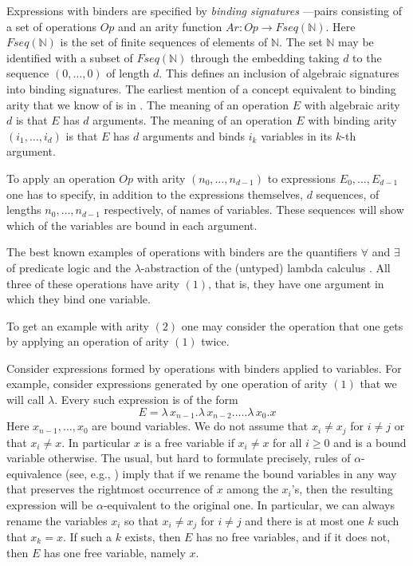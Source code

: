 \documentclass[onecolumn,12pt]{amsart}
\numberwithin{proposition}{subsection}
\newcommand{\sr}{\rightarrow}
\newcommand{\nn}{{\mathbb N}}
\newcommand{\nat}{\nn}
\begin{document}
Expressions with binders are specified by {\em binding signatures}%
---pairs consisting of a set of operations $Op$ and an arity function $Ar:Op\sr Fseq(\nat)$.
Here $Fseq(\nat)$ is the set of finite sequences of elements of
$\nat$. The set $\nat$ may be identified with a subset of $Fseq(\nat)$ through the
embedding taking $d$ to the sequence $(0,\dots,0)$ of length $d$. This defines
an inclusion of algebraic signatures into binding signatures. The earliest
mention of a concept equivalent to binding arity that we know of is in
\cite{Aczel1978}. The meaning of an operation $E$ with algebraic arity $d$
is that $E$ has $d$ arguments. The meaning of an operation $E$ with binding
arity $(i_1,\dots,i_d)$ is that $E$ has $d$ arguments and binds $i_k$ variables
in its $k$-th argument.

To apply an operation $Op$ with arity $(n_0,\dots,n_{d-1})$ to expressions
$E_0,\dots,E_{d-1}$ one has to specify, in addition to the expressions
themselves, $d$ sequences, of lengths $n_0,\dots,n_{d-1}$ respectively, of
names of variables. These sequences will show which of the variables are bound
in each argument.

The best known examples of operations with binders are the quantifiers
$\forall$ and $\exists$ of predicate logic and the $\lambda$-abstraction of the
(untyped) lambda calculus \cite{Church1932,Barendregt}. All three of
these operations have arity $(1)$, that is, they have one argument in which
they bind one variable.

To get an example with arity $(2)$ one may consider the operation that one gets by applying an operation of arity $(1)$ twice.

Consider expressions formed by operations with binders applied to
variables. For example, consider expressions generated by one operation of
arity $(1)$ that we will call $\lambda$. Every such expression is of the form
%
$$E=\lambda\,x_{n-1}.\lambda\,x_{n-2}.\dots.\lambda\,x_0.x$$
%
Here $x_{n-1},\dots,x_{0}$ are bound variables.  We do not assume that $x_i\ne x_j$
for $i\ne j$ or that $x_i\ne x$. In particular $x$ is a free variable if
$x_i\ne x$ for all $i\ge 0$ and is a bound variable otherwise. The usual, but hard to
formulate precisely, rules of $\alpha$-equivalence (see, e.g., \cite[Def. 2.1.11,
  p.~26]{Barendregt}) imply that if we rename the bound variables in any way
that preserves the rightmost occurrence of $x$ among the $x_i$'s, then the
resulting expression will be $\alpha$-equivalent to the original one. In
particular, we can always rename the variables $x_i$ so that $x_i\ne x_j$ for $i\ne j$ and
there is at most one $k$ such that $x_k=x$. If such a $k$ exists, then $E$ has
no free variables, and if it does not, then $E$ has one free variable, namely $x$.
\end{document}

